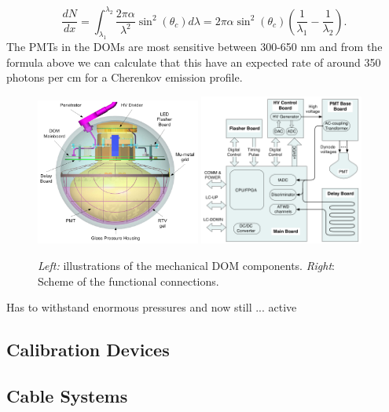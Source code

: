 \begin{equation}
\frac{dN}{dx} = \int_{\lambda_1}^{\lambda_2} \frac{2 \pi \alpha}{\lambda^2} \sin^2 \left(\theta_c\right) d\lambda = 2\pi \alpha \sin^2 \left(\theta_c\right) \left(\frac{1}{\lambda_1} -\frac{1}{\lambda_2}\right).
\end{equation}
The PMTs in the DOMs are most sensitive between 300-650 nm and from the formula above we can calculate that this have an expected rate of around 350 photons per cm for a Cherenkov emission profile.

\begin{figure}
\includegraphics[width=0.48\textwidth]{chapter5/img/DOM-Picture.png}
\includegraphics[width=0.48\textwidth]{chapter5/img/electronicsDOM.png}
\caption{\textit{Left:} illustrations of the mechanical DOM components. \textit{Right}: Scheme of the functional connections.}
\label{fig:DOM}
\end{figure}

Has to withstand enormous pressures and now still ... active

\subsection{Calibration Devices}
\subsection{Cable Systems}
\label{subsec:cablesystems}

